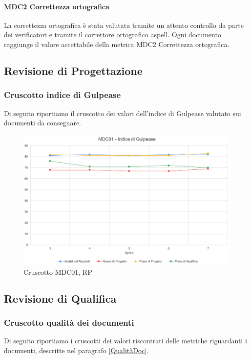 \paragraph{MDC2 Correttezza ortografica}

La correttezza ortografica è stata valutata tramite un attento controllo da parte dei verificatori e tramite il correttore ortografico aspell.  Ogni documento raggiunge il valore accettabile della metrica MDC2 Correttezza ortografica. 
\newpage{}
\subsection{Revisione di Progettazione}
\subsubsection{Cruscotto indice di Gulpease}

Di seguito riportiamo il cruscotto dei valori dell'indice di Gulpease valutato sui documenti da consegnare.

\begin{figure}[H]
    \centering
    \includegraphics[scale = 0.55]{immagini/GulpeaseRP.png}
    \caption{Cruscotto MDC01, RP}
\end{figure}

\newpage

\subsection{Revisione di Qualifica}
\subsubsection{Cruscotto qualità dei documenti}
Di seguito riportiamo i cruscotti dei valori riscontrati delle metriche riguardanti i documenti, descritte nel paragrafo \ref{QualitàDoc}.
